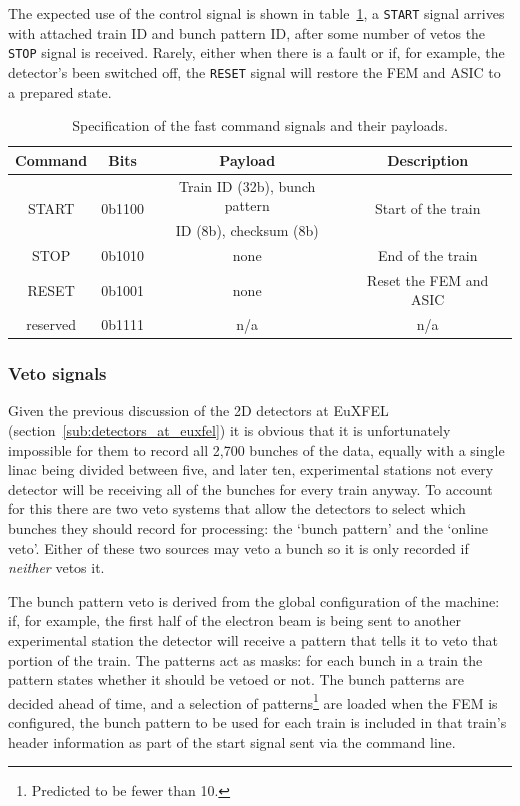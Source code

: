 The expected use of the control signal is shown in table~\ref{tab:fast_commands}, a \texttt{START} signal arrives with attached train ID and bunch pattern ID, after some number of vetos the \texttt{STOP} signal is received. Rarely, either when there is a fault or if, for example, the detector's been switched off, the \texttt{RESET} signal will restore the FEM and ASIC to a prepared state.
\begin{table}[htbp]
  \begin{center}
  \begin{tabular}{c | c | c | c}
    Command  & Bits   & Payload & Description \\
    \hline   
    \multirow{2}{*}{START}    
             & \multirow{2}{*}{0b1100}
                      & Train ID (32b), bunch pattern  & \multirow{2}{*}{Start of the train} \\
             &        & ID (8b), checksum (8b)         & \\
    STOP     & 0b1010 & none                           & End of the train \\
    RESET    & 0b1001 & none                           & Reset the FEM and ASIC \\
    reserved & 0b1111 & n/a                            & n/a\\
  \end{tabular}
  \end{center}
  \caption{Specification of the fast command signals and their payloads.}
  \label{tab:fast_commands}
\end{table}
\subsubsection{Veto signals} %
\label{sub:veto_signal}
Given the previous discussion of the 2D detectors at EuXFEL (section~\ref{sub:detectors_at_euxfel}) it is obvious that it is unfortunately impossible for them to record all 2,700 bunches of the data, equally with a single linac being divided between five, and later ten, experimental stations not every detector will be receiving all of the bunches for every train anyway. To account for this there are two veto systems that allow the detectors to select which bunches they should record for processing: the `bunch pattern' and the `online veto'. Either of these two sources may veto a bunch so it is only recorded if \emph{neither} vetos it. 

The bunch pattern veto is derived from the global configuration of the machine: if, for example, the first half of the electron beam is being sent to another experimental station the detector will receive a pattern that tells it to veto that portion of the train. The patterns act as masks: for each bunch in a train the pattern states whether it should be vetoed or not. The bunch patterns are decided ahead of time, and a selection of patterns\footnote{Predicted to be fewer than 10.} are loaded when the FEM is configured, the bunch pattern to be used for each train is included in that train's header information as part of the start signal sent via the command line.

